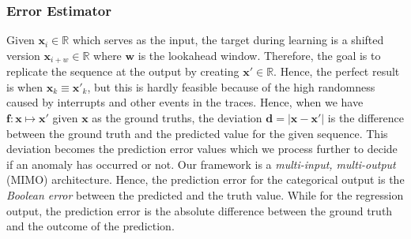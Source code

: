 \subsubsection{Error Estimator}
\label{subsec:error-model}
Given $ \bm{x}_i \in \bm{\mathbb{R}} $ which serves as the 
input, the target 
during learning is a shifted version $ \bm{x}_{i+w} \in 
\bm{\mathbb{R}} $ where 
$ \bm{w} $ is the lookahead window. Therefore, the goal is to 
replicate the 
sequence at the output by creating $ \bm{x}' \in 
\bm{\mathbb{R}}$. Hence, the 
perfect result is when $\bm{x}_k  \equiv \bm{x}'_k $, but 
this is hardly 
feasible because of the high randomness caused by interrupts 
and other events 
in the traces. Hence, when we have $ \bm{f}:\bm{x}\longmapsto 
\bm{x}' $ given $ 
\bm{x} $ as the ground truths, the deviation $ \bm{d} = 
|\bm{x} - \bm{x}'|$ is the difference between the ground 
truth and the 
predicted value for the 
given sequence. This deviation becomes the prediction error 
values which we 
process further to decide if an anomaly has occurred or not. 
Our framework is a
\emph{multi-input, multi-output} (MIMO) architecture. Hence, 
the prediction 
error for 
the categorical output is the \emph{Boolean error} between 
the predicted and 
the truth value. While for the regression output, the 
prediction error is the 
absolute difference between the ground truth and the outcome 
of the prediction.

